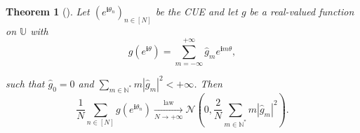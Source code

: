 \documentclass[twoside,11pt]{book}
\newtheorem{theorem}{Theorem}
\numberwithin{theorem}{chapter}
\numberwithin{definition}{chapter}
\numberwithin{proposition}{chapter}
\numberwithin{corollary}{chapter}
\numberwithin{example}{chapter}
\numberwithin{lemma}{chapter}
\numberwithin{assumption}{chapter}
\numberwithin{equation}{chapter}
\numberwithin{figure}{chapter}
\DeclareMathOperator{\Det}{Det}
\begin{document}
\begin{theorem}[\cite{Joh97}]\label{thm:johansson}
Let $(e^{\mathbf{i} \theta_{n}})_{n \in [N]}$ be the CUE and let $g$ be a real-valued function on $\mathbb{U}$ with 
\begin{equation}
g(e^{\mathbf{i}  \theta}) = \sum_{m =-\infty}^{+\infty} \hat{g}_{m}e^{\mathbf{i}  m \theta},
\end{equation}

 such that $\hat{g}_{0} = 0$ and $\sum_{m \in \mathbb{N}^{*}} m|\hat{g}_{m}|^{2} <+\infty$. Then 
 \begin{equation}
  \frac{1}{N}\sum_{n \in [N]} g(e^{\mathbf{i}\theta_{n}}) 
  \xrightarrow[N \rightarrow +\infty]{\text{law}} \mathcal{N}(0,\frac{2}{N}\sum_{m \in \mathbb{N}^{*}} m|\hat{g}_{m}|^{2}).
 \end{equation}

\end{theorem}



\end{document}
